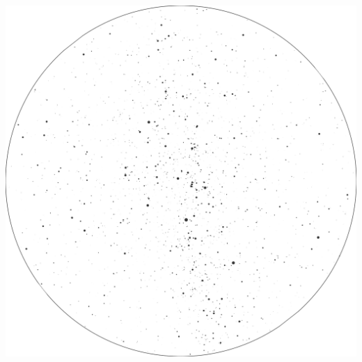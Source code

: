 \documentclass{./SAS-class-skygen}
\begin{document}
	\vspace{0.5cm}
    \begin{center}
    \includegraphics[width=\textwidth]{./pics/skychart60.png}
    \end{center}
    
    
\end{document}
